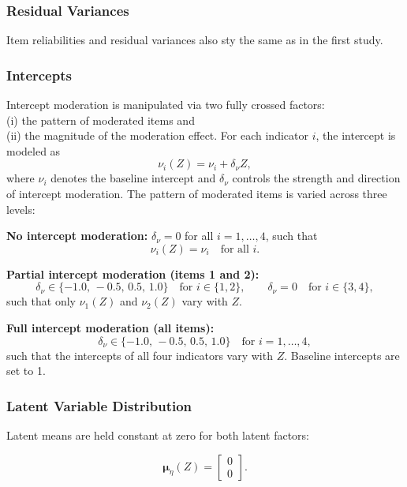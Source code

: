 \documentclass[
  man,
  floatsintext]{apa7}
\begin{document}
\subsubsection{Residual Variances}\label{residual-variances-1}

Item reliabilities and residual variances also sty the same as in the
first study.

\subsubsection{Intercepts}\label{intercepts-1}

Intercept moderation is manipulated via two fully crossed factors:\\
(i) the pattern of moderated items and\\
(ii) the magnitude of the moderation effect. For each indicator \(i\),
the intercept is modeled as \[
\nu_i(Z) = \nu_i + \delta_{\nu} Z,
\] where \(\nu_i\) denotes the baseline intercept and \(\delta_{\nu}\)
controls the strength and direction of intercept moderation. The pattern
of moderated items is varied across three levels:

\textbf{No intercept moderation:} \(\delta_{\nu} = 0\) for all
\(i = 1,\dots,4\), such that \[
  \nu_i(Z) = \nu_i \quad \text{for all } i.
  \]

\textbf{Partial intercept moderation (items 1 and 2):}\\
\[
    \delta_{\nu} \in \{-1.0,\,-0.5,\,0.5,\,1.0\} \quad \text{for } i \in \{1,2\},
    \qquad
    \delta_{\nu} = 0 \quad \text{for } i \in \{3,4\},
    \] such that only \(\nu_1(Z)\) and \(\nu_2(Z)\) vary with \(Z\).

\textbf{Full intercept moderation (all items):}\\
\[
    \delta_{\nu} \in \{-1.0,\,-0.5,\,0.5,\,1.0\} \quad \text{for } i = 1,\dots,4,
  \] such that the intercepts of all four indicators vary with \(Z\).
Baseline intercepts are set to 1.

\subsubsection{Latent Variable
Distribution}\label{latent-variable-distribution}

Latent means are held constant at zero for both latent factors:

\[
\boldsymbol{\mu}_\eta(Z) = 
\begin{bmatrix}
0 \\[4pt]
0
\end{bmatrix}.
\]
\end{document}
